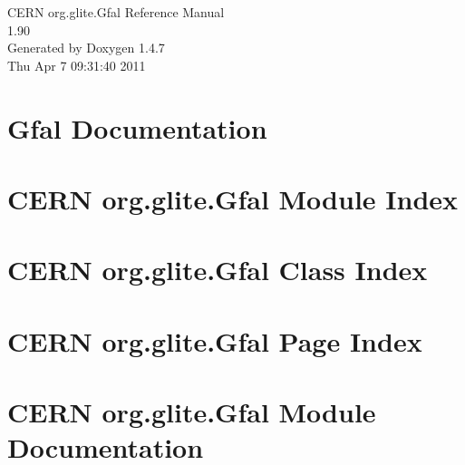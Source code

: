 \documentclass[a4paper]{book}
\begin{document}
\begin{titlepage}
\vspace*{7cm}
\begin{center}
{\Large CERN org.glite.Gfal Reference Manual\\[1ex]\large 1.90 }\\
\vspace*{1cm}
{\large Generated by Doxygen 1.4.7}\\
\vspace*{0.5cm}
{\small Thu Apr 7 09:31:40 2011}\\
\end{center}
\end{titlepage}
\clearemptydoublepage
{}
\tableofcontents
\clearemptydoublepage
{}
\chapter{Gfal Documentation }
\label{index}
\chapter{CERN org.glite.Gfal Module Index}

\chapter{CERN org.glite.Gfal Class Index}

\chapter{CERN org.glite.Gfal Page Index}

\chapter{CERN org.glite.Gfal Module Documentation}







\end{document}

